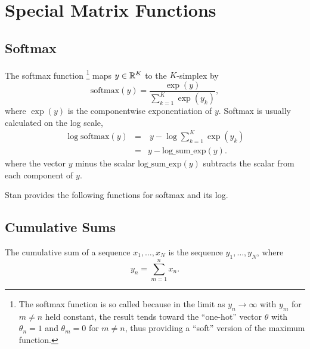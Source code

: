 \section{Special Matrix Functions}\label{softmax.section}

\subsection{Softmax}

The softmax function%
%
\footnote{The softmax function is so called because in the limit as
  $y_n \rightarrow \infty$ with $y_m$ for $m \neq n$ held constant,
  the result tends toward the ``one-hot'' vector $\theta$ with
  $\theta_n = 1$ and $\theta_m = 0$ for $m \neq n$, thus providing a
  ``soft'' version of the maximum function.}  
maps $y \in \reals^K$ to the $K$-simplex by
\[
\mbox{softmax}(y)
 = \frac{\exp(y)}
        {\sum_{k=1}^K \exp(y_k)},
\]
%
where $\exp(y)$ is the componentwise exponentiation of $y$.
%
Softmax is usually calculated on the log scale, 
%
\begin{eqnarray*}
\log \mbox{softmax}(y)
& = & \ y - \log \sum_{k=1}^K \exp(y_k)
\\[4pt]
& = & y - \mbox{log\_sum\_exp}(y).
\end{eqnarray*}
%
where the vector $y$ minus the scalar $\mbox{log\_sum\_exp}(y)$
subtracts the scalar from each component of $y$.

Stan provides the following functions for softmax and its log.
%
\begin{description}
%
\end{description}
%

\subsection{Cumulative Sums}

The cumulative sum of a sequence $x_1,\ldots,x_N$ is the 
sequence $y_1,\ldots,y_N$, where 
%
\[
y_n = \sum_{m = 1}^{n} x_n.
\]

\begin{description}
%
%
%
%
\end{description}

